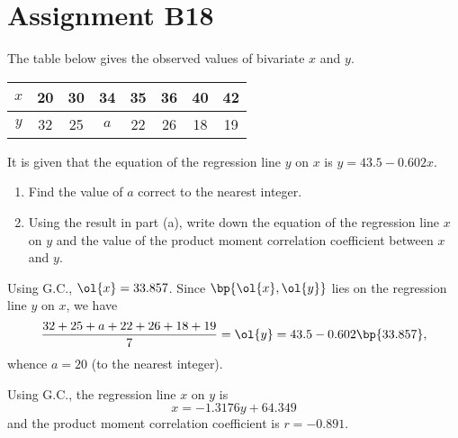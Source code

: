 \section{Assignment B18}

\begin{problem}
    The table below gives the observed values of bivariate $x$ and $y$.

    \begin{table}[H]
        \centering
        \begin{tabular}{|c|c|c|c|c|c|c|c|}
        \hline
        $x$ & 20 & 30 & 34 & 35 & 36 & 40 & 42 \\ \hline
        $y$ & 32 & 25 & $a$ & 22 & 26 & 18 & 19 \\ \hline
        \end{tabular}
    \end{table}

    It is given that the equation of the regression line $y$ on $x$ is $y = 43.5 - 0.602x$.

    \begin{enumerate}
        \item Find the value of $a$ correct to the nearest integer.
        \item Using the result in part (a), write down the equation of the regression line $x$ on $y$ and the value of the product moment correlation coefficient between $x$ and $y$.
    \end{enumerate}
\end{problem}
\begin{solution}
    \begin{ppart}
        Using G.C., $\ol{x} = 33.857$. Since $\bp{\ol{x}, \ol{y}}$ lies on the regression line $y$ on $x$, we have \[\frac{32 + 25 + a + 22 + 26 + 18 + 19}{7} = \ol{y} = 43.5 - 0.602 \bp{33.857},\] whence $a = 20$ (to the nearest integer).
    \end{ppart}
    \begin{ppart}
        Using G.C., the regression line $x$ on $y$ is \[x = -1.3176 y + 64.349\] and the product moment correlation coefficient is $r = -0.891$.
    \end{ppart}
\end{solution}

